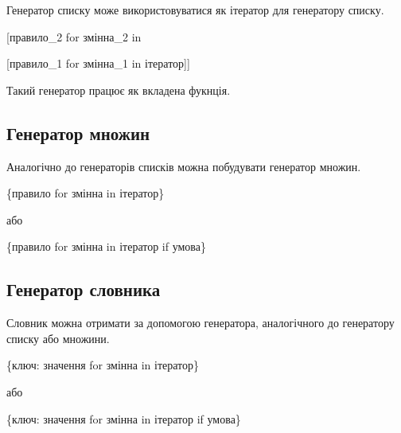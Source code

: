 \begin{frame}
Генератор списку може використовуватися як ітератор для генератору списку.

\vspace{1cm}

\LARGE{[правило\_2 for змінна\_2 in 

[правило\_1 for змінна\_1 in ітератор]]}

\vspace{1cm}

\normalsize Такий генератор працює як вкладена фукнція.

\end{frame}

 \subsection{Генератор множин} 
\begin{frame}
Аналогічно до генераторів списків можна побудувати генератор множин.

\LARGE{\{правило for змінна in ітератор\}}

\normalsize або

\LARGE{\{правило for змінна in ітератор if умова\}}

\end{frame}

 \subsection{Генератор словника} 
\begin{frame}
Словник можна отримати за допомогою генератора, аналогічного до генератору списку або множини.

\Large{\{ключ: значення for змінна in ітератор\}}

\normalsize або

\Large{\{ключ: значення for змінна in ітератор if умова\}}

\end{frame}

